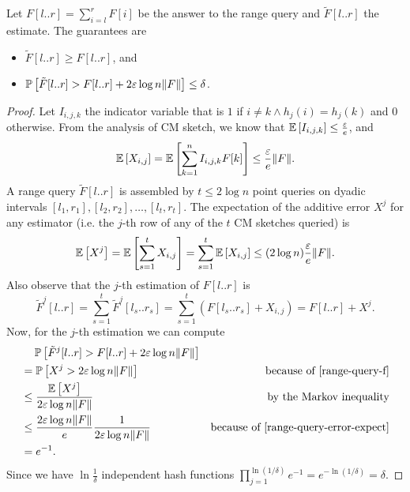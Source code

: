 Let $F[l..r]=\sum_{i=l}^rF[i]$ be the answer to the range query and $\tilde{F}[l..r]$ the estimate. The guarantees are
\begin{itemize}
  \item $\tilde{F}[l..r] \geq F[l..r]$, and
  \item $\operatorname*{\mathbb{P}}\left[{\tilde{F}[l..r] > F[l..r]+2\varepsilon\log n\lVert F\rVert}\right] \leq \delta$.
\end{itemize}

\begin{proof}
  Let $I_{i,j,k}$ the indicator variable that is $1$ if $i \ne k \wedge h_j(i)=h_j(k)$ and $0$ otherwise. From the analysis of CM sketch, we know that
  $\mathbb{E}\left[{I_{i,j,k}}\right] \leq \frac{\varepsilon}{e}$,
  and
  $$\mathbb{E}\left[{X_{i,j}}\right] = \mathbb{E}\left[{\sum_{k=1}^n I_{i,j,k}F[k]}\right] \leq \frac{\varepsilon}{e}\lVert F\rVert.$$
  A range query $\tilde{F}[l..r]$ is assembled by  $t \leq 2\log n$ point queries on dyadic intervals $[l_1,r_1], [l_2,r_2], \dots, [l_t,r_t]$. 
  The expectation of the additive error $X^j$ for any estimator (i.e. the $j$-th row of any of the $t$ CM sketches queried) is
  \begin{equation}
    \mathbb{E}\left[{X^j}\right] = \mathbb{E}\left[{\sum_{s=1}^tX_{i,j}}\right]=\sum_{s=1}^t\mathbb{E}\left[{X_{i,j}}\right] \leq (2\log n) \frac{\varepsilon}{e}\lVert F\rVert.
    \label{range-query-error-expect}
  \end{equation}
  Also observe that the $j$-th estimation of $F[l..r]$ is
  \begin{equation}
    \tilde{F}^j[l..r]= \sum_{s=1}^t \tilde{F}^j[l_s..r_s] = \sum_{s=1}^t (F[l_s..r_s] + X_{i,j}) = F[l..r]+X^j.
    \label{range-query-f}
  \end{equation}
  Now, for the $j$-th estimation we can compute
  \begin{align*}
    &\phantom{={}} \prob{\tilde{F}^j[l..r] > F[l..r]+2\varepsilon\log n\norm{F}} & \\
    &= \prob{X^j > 2\varepsilon\log n\norm{F}} & \text{because of \eqref{range-query-f}} \\
    &\leq \frac{\E{X^j}}{2\varepsilon\log n\norm{F}} & \text{by the Markov inequality} \\
    &\leq  \frac{2\varepsilon\log n\norm{F}}{e} \frac{1}{2\varepsilon\log n\norm{F}} & \text{because of \eqref{range-query-error-expect}} \\
    &= e^{-1}. &
  \end{align*}
  Since we have $\ln\frac{1}{\delta}$ independent hash functions $\prod_{j=1}^{\ln(1/\delta)}e^{-1}=e^{-\ln(1/\delta)}=\delta$.
\end{proof}

